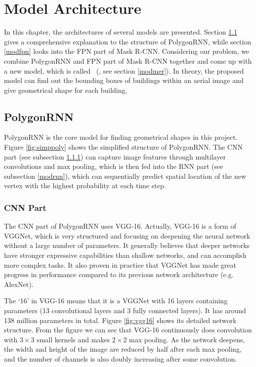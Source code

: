\chapter{Model Architecture}

In this chapter, the architectures of several models are presented. Section \ref{modpoly} gives a comprehensive explanation to the structure of PolygonRNN, while section \ref{modfpn} looks into the FPN part of Mask R-CNN. Considering our problem, we combine PolygonRNN and FPN part of Mask R-CNN together and come up with a new model, which is called \modelnameshort\ (\modelnamelong, see section \ref{modmer}). In theory, the proposed model can find out the bounding boxes of buildings within an aerial image and give geometrical shape for each building.
 
\section{PolygonRNN}\label{modpoly}

PolygonRNN is the core model for finding geometrical shapes in this project. Figure \ref{fig:simppoly} shows the simplified structure of PolygonRNN. The CNN part (see subsection \ref{modcnn}) can capture image features through multilayer convolutions and max pooling, which is then fed into the RNN part (see subsection \ref{modrnn}), which can sequentially predict spatial location of the new vertex with the highest probability at each time step.



\subsection{CNN Part}\label{modcnn}

The CNN part of PolygonRNN uses VGG-16. Actually, VGG-16 is a form of VGGNet, which is very structured and focusing on deepening the  neural network without a large number of parameters. It generally believes that deeper networks have stronger expressive capabilities than shallow networks, and can accomplish more complex tasks. It also proven in practice that VGGNet has made great progress in performance compared to its previous network architecture (e.g. AlexNet).

The `16' in VGG-16 means that it is a VGGNet with 16 layers containing parameters (13 convolutional layers and 3 fully connected layers). It has around 138 million parameters in total. Figure \ref{fig:vgg16} shows its detailed network structure. From the figure we can see that VGG-16 continuously does convolution with $3\times3$ small kernels and makes $2\times2$ max pooling. As the network deepens, the width and height of the image are reduced by half after each max pooling, and the number of channels is also doubly increasing after some convolution.

